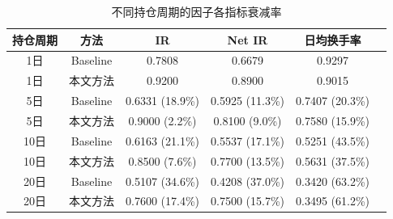 
\begin{table}[htbp]
\centering
\caption{不同持仓周期的因子各指标衰减率}
\label{tab:decay_rates}
\begin{tabular}{cccccc}
\toprule
\textbf{持仓周期} & \textbf{方法} & \textbf{IR} & \textbf{Net IR} & \textbf{日均换手率} \\
\midrule
1日 & Baseline & 0.7808 & 0.6679 & 0.9297 \\
1日 & 本文方法 & 0.9200 & 0.8900 & 0.9015 \\
5日 & Baseline & 0.6331 (18.9\%) & 0.5925 (11.3\%) & 0.7407 (20.3\%) \\
5日 & 本文方法 & 0.9000 (2.2\%) & 0.8100 (9.0\%) & 0.7580 (15.9\%) \\
10日 & Baseline & 0.6163 (21.1\%) & 0.5537 (17.1\%) & 0.5251 (43.5\%) \\
10日 & 本文方法 & 0.8500 (7.6\%) & 0.7700 (13.5\%) & 0.5631 (37.5\%) \\
20日 & Baseline & 0.5107 (34.6\%) & 0.4208 (37.0\%) & 0.3420 (63.2\%) \\
20日 & 本文方法 & 0.7600 (17.4\%) & 0.7500 (15.7\%) & 0.3495 (61.2\%) \\
\bottomrule
\end{tabular}
\end{table}
